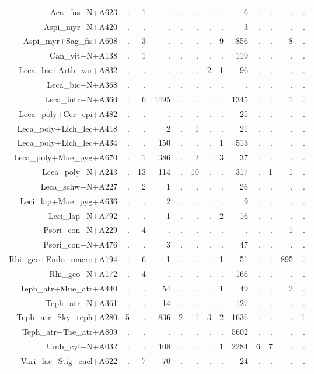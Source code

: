 \documentclass[a4paper, 11]{article}\usepackage[]{graphicx}\usepackage[]{color}
\begin{document}
\begin{table}
\begin{tabular}{rrrrrrrrrrrrr}
  \hline
Aca\_fus+N+A623 & . & 1 & . & . & . & . & . & 6 & . & . & . & . \\ 
  Aspi\_myr+N+A420 & . & . & . & . & . & . & . & 3 & . & . & . & . \\ 
  Aspi\_myr+Sag\_fis+A608 & . & 3 & . & . & . & . & 9 & 856 & . & . & 8 & . \\ 
  Can\_vit+N+A138 & . & 1 & . & . & . & . & . & 119 & . & . & . & . \\ 
  Leca\_bic+Arth\_var+A832 & . & . & . & . & . & 2 & 1 & 96 & . & . & . & . \\ 
  Leca\_bic+N+A368 & . & . & . & . & . & . & . & . & . & . & . & . \\ 
  Leca\_intr+N+A360 & . & 6 & 1495 & . & . & . & . & 1345 & . & . & 1 & . \\ 
  Leca\_poly+Cer\_epi+A482 & . & . & . & . & . & . & . & 25 & . & . & . & . \\ 
  Leca\_poly+Lich\_lec+A418 & . & . & 2 & . & 1 & . & . & 21 & . & . & . & . \\ 
  Leca\_poly+Lich\_lec+A434 & . & . & 150 & . & . & . & 1 & 513 & . & . & . & . \\ 
  Leca\_poly+Mue\_pyg+A670 & . & 1 & 386 & . & 2 & . & 3 & 37 & . & . & . & . \\ 
  Leca\_poly+N+A243 & . & 13 & 114 & . & 10 & . & . & 317 & . & 1 & 1 & . \\ 
  Leca\_schw+N+A227 & . & 2 & 1 & . & . & . & . & 26 & . & . & . & . \\ 
  Leci\_lap+Mue\_pyg+A636 & . & . & 2 & . & . & . & . & 9 & . & . & . & . \\ 
  Leci\_lap+N+A792 & . & . & 1 & . & . & . & 2 & 16 & . & . & . & . \\ 
  Psori\_con+N+A229 & . & 4 & . & . & . & . & . & . & . & . & 1 & . \\ 
  Psori\_con+N+A476 & . & . & 3 & . & . & . & . & 47 & . & . & . & . \\ 
  Rhi\_geo+Endo\_macro+A194 & . & 6 & 1 & . & . & . & 1 & 51 & . & . & 895 & . \\ 
  Rhi\_geo+N+A172 & . & 4 & . & . & . & . & . & 166 & . & . & . & . \\ 
  Teph\_atr+Mue\_atr+A440 & . & . & 54 & . & . & . & 1 & 49 & . & . & 2 & . \\ 
  Teph\_atr+N+A361 & . & . & 14 & . & . & . & . & 127 & . & . & . & . \\ 
  Teph\_atr+Sky\_teph+A280 & 5 & . & 836 & 2 & 1 & 3 & 2 & 1636 & . & . & . & 1 \\ 
  Teph\_atr+Tae\_atr+A809 & . & . & . & . & . & . & . & 5602 & . & . & . & . \\ 
  Umb\_cyl+N+A032 & . & . & 108 & . & . & . & 1 & 2284 & 6 & 7 & . & . \\ 
  Vari\_lac+Stig\_eucl+A622 & . & 7 & 70 & . & . & . & . & 24 & . & . & . & . \\ 
   \hline
\end{tabular}
\end{table}
\end{document}
